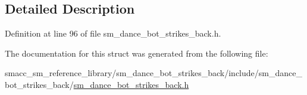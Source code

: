 \subsection{Detailed Description}


Definition at line 96 of file sm\+\_\+dance\+\_\+bot\+\_\+strikes\+\_\+back.\+h.



The documentation for this struct was generated from the following file\+:\begin{DoxyCompactItemize}
\item 
smacc\+\_\+sm\+\_\+reference\+\_\+library/sm\+\_\+dance\+\_\+bot\+\_\+strikes\+\_\+back/include/sm\+\_\+dance\+\_\+bot\+\_\+strikes\+\_\+back/\hyperlink{sm__dance__bot__strikes__back_8h}{sm\+\_\+dance\+\_\+bot\+\_\+strikes\+\_\+back.\+h}\end{DoxyCompactItemize}
